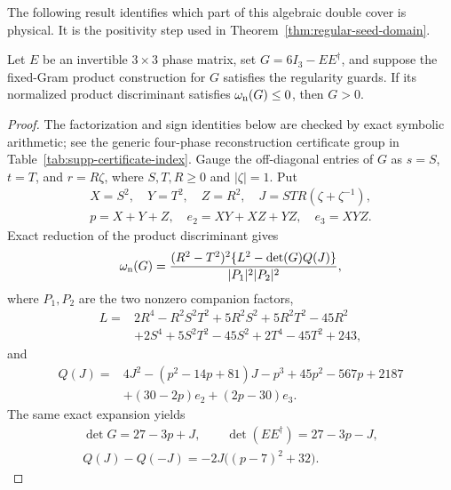 The following result identifies which part of this algebraic double cover is physical. It is the positivity step used in Theorem~\ref{thm:regular-seed-domain}.


\begin{lemma}
\label{lem:supp-complement-positivity}
Let $E$ be an invertible $3\times3$ phase matrix, set $G=6I_3-EE^\dagger$, and suppose the fixed-Gram product construction for $G$ satisfies the regularity guards.  If its normalized product discriminant satisfies $\omega_{\rm n}(G)\leq0$, then $G>0$.
\end{lemma}

\begin{proof}
The factorization and sign identities below are checked by exact symbolic arithmetic; see the generic four-phase reconstruction certificate group in Table~\ref{tab:supp-certificate-index}.
Gauge the off-diagonal entries of $G$ as $s=S$, $t=T$, and $r=R\zeta$, where $S,T,R\geq0$ and $|\zeta|=1$.  Put
\begin{equation}
\begin{gathered}
X=S^2,\quad Y=T^2,\quad Z=R^2,\quad
J=STR(\zeta+\zeta^{-1}),\\
p=X+Y+Z,\quad e_2=XY+XZ+YZ,\quad e_3=XYZ.
\end{gathered}
\label{eq:supp-positivity-invariants}
\end{equation}
Exact reduction of the product discriminant gives
\begin{equation}
\omega_{\rm n}(G)=
\frac{(R^2-T^2)^2\{L^2-\det(G)Q(J)\}}
{|P_1|^2|P_2|^2},
\label{eq:supp-positivity-factorization}
\end{equation}
where $P_1,P_2$ are the two nonzero companion factors,
\begin{equation}
\begin{aligned}
L={}&2R^4-R^2S^2T^2+5R^2S^2+5R^2T^2-45R^2\\
&+2S^4+5S^2T^2-45S^2+2T^4-45T^2+243,
\end{aligned}
\label{eq:supp-positivity-L}
\end{equation}
and
\begin{equation}
\begin{aligned}
Q(J)={}&4J^2-(p^2-14p+81)J-p^3+45p^2-567p+2187\\
&+(30-2p)e_2+(2p-30)e_3.
\end{aligned}
\label{eq:supp-positivity-Q}
\end{equation}
The same exact expansion yields
\begin{equation}
\begin{gathered}
\det G=27-3p+J,\qquad
\det(EE^\dagger)=27-3p-J,\\
Q(J)-Q(-J)=-2J\bigl((p-7)^2+32\bigr).
\end{gathered}
\label{eq:supp-positivity-sign-identities}
\end{equation}


\end{proof}

